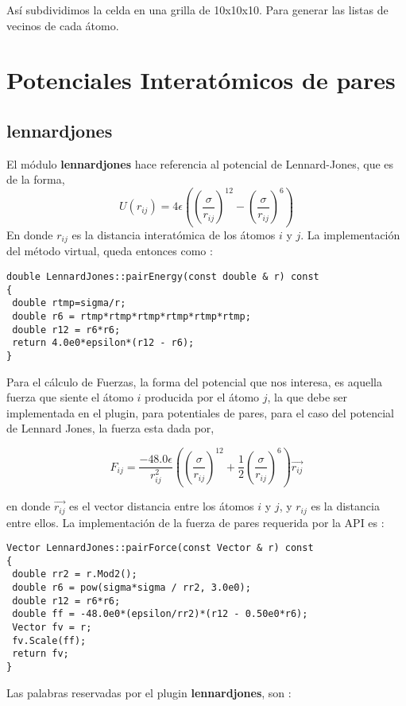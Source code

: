 As\'i subdividimos la celda en una grilla de 10x10x10. Para generar las listas de vecinos de cada \'atomo.
\section{Potenciales Interat\'omicos de pares}
\subsection{lennardjones}
El m\'odulo \textbf{lennardjones} hace referencia al potencial de Lennard-Jones, que es de la forma,
$$U(r_{ij}) = 4\epsilon\left(\left(\frac{\sigma}{r_{ij}}\right)^{12}-\left(\frac{\sigma}{r_{ij}}\right)^6\right)$$
En donde $r_{ij}$ es la distancia interat\'omica de los \'atomos $i$ y $j$. La implementaci\'on del m\'etodo virtual, queda entonces como :
\begin{verbatim}
double LennardJones::pairEnergy(const double & r) const
{
 double rtmp=sigma/r;
 double r6 = rtmp*rtmp*rtmp*rtmp*rtmp*rtmp;
 double r12 = r6*r6;
 return 4.0e0*epsilon*(r12 - r6);
}
\end{verbatim}

Para el c\'alculo de Fuerzas, la forma del potencial que nos interesa, es aquella fuerza que siente el \'atomo $i$ producida por el \'atomo $j$, la que debe ser implementada en el plugin, para potentiales de pares, para el caso del potencial de Lennard Jones, la fuerza esta dada por,

$$F_{ij} = \frac{-48.0\epsilon}{r_{ij}^2}\left( \left(\frac{\sigma}{r_{ij}}\right)^{12} + \frac{1}{2}\left(\frac{\sigma}{r_{ij}}\right)^6 \right) \vec{r_{ij}}$$

en donde $\vec{r_{ij}}$ es el vector distancia entre los \'atomos $i$ y $j$, y $r_{ij}$ es la distancia entre ellos. La implementaci\'on de la fuerza de pares requerida por la API es :

\begin{verbatim}
Vector LennardJones::pairForce(const Vector & r) const
{
 double rr2 = r.Mod2();
 double r6 = pow(sigma*sigma / rr2, 3.0e0);
 double r12 = r6*r6;
 double ff = -48.0e0*(epsilon/rr2)*(r12 - 0.50e0*r6);
 Vector fv = r;
 fv.Scale(ff);
 return fv;
}
\end{verbatim}

Las palabras reservadas por el plugin \textbf{lennardjones}, son :


